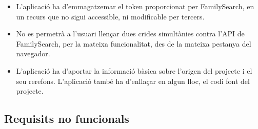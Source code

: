 \begin{itemize}
        \item L'aplicació ha d'emmagatzemar el token proporcionat per FamilySearch, en un recurs que no sigui accessible, ni modificable per tercers.
        \item No es permetrà a l'usuari llençar dues crides simultànies contra l’API de Family\-Search, per la mateixa funcionalitat, des de la mateixa pestanya del navegador.
        \item L’aplicació ha d'aportar la informació bàsica sobre l’origen del projecte i el seu rerefons. L'aplicació també ha d’enllaçar en algun lloc, el codi font del projecte.
    \end{itemize}


    \subsection{Requisits no funcionals}

